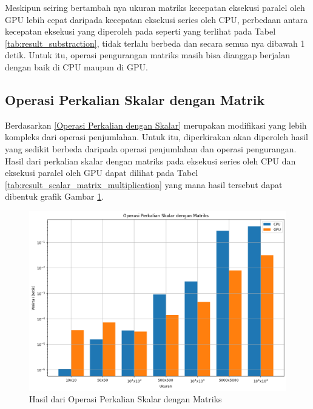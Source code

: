 Meskipun seiring bertambah nya ukuran matriks kecepatan eksekusi paralel oleh GPU lebih cepat daripada kecepatan eksekusi series oleh CPU, perbedaan antara kecepatan eksekusi yang diperoleh pada seperti yang terlihat pada Tabel \ref{tab:result_substraction}, tidak terlalu berbeda dan secara semua nya dibawah 1 detik. Untuk itu, operasi pengurangan matriks masih bisa dianggap berjalan dengan baik di CPU maupun di GPU.

\subsection{Operasi Perkalian Skalar dengan Matrik}

Berdasarkan \ref{Operasi Perkalian dengan Skalar} merupakan modifikasi yang lebih kompleks dari operasi penjumlahan. Untuk itu, diperkirakan akan diperoleh hasil yang sedikit berbeda daripada operasi penjumlahan dan operasi pengurangan. Hasil dari perkalian skalar dengan matriks pada eksekusi series oleh CPU dan eksekusi paralel oleh GPU dapat dilihat pada Tabel \ref{tab:result_scalar_matrix_multiplication} yang mana hasil tersebut dapat dibentuk grafik Gambar \ref{img:result_scalar_matrix_multiplication}.

\begin{figure}[H]
	\centering
	\includegraphics[width=14cm, scale=1]{images/penelitian/scalar-matrix-multiplication.png}
	\caption{Hasil dari Operasi Perkalian Skalar dengan Matriks}
	\label{img:result_scalar_matrix_multiplication}
\end{figure}


